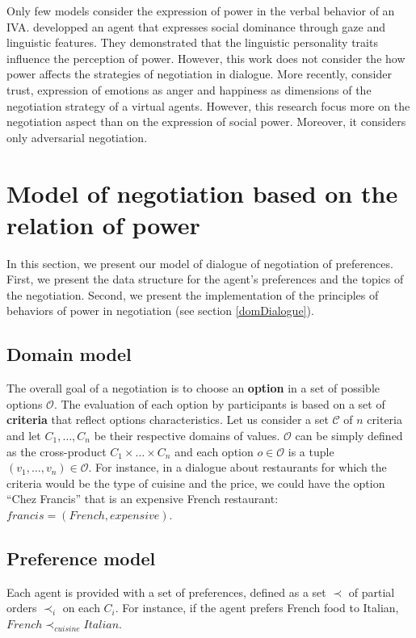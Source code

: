 \documentclass{llncs}
\begin{document}
	Only few models consider the expression of power in the verbal behavior of an IVA. \cite{bee2010bossy} developped an agent that expresses social dominance through gaze and linguistic features. They demonstrated that the linguistic personality traits influence the perception of power. However, this work does not consider the how power affects the strategies of negotiation in dialogue. More recently, \cite{traum2008multi,de2011effect,de2015humans}consider trust, expression of emotions as anger and happiness as dimensions of the negotiation strategy of a virtual agents. However, this research focus more on the negotiation aspect than on the expression of social power. Moreover, it considers only adversarial negotiation.
	
	
	\section{Model of negotiation based on the relation of power}
	In this section, we present our model of dialogue of negotiation of preferences.	
	First, we present the data structure for the agent's preferences and the topics of the negotiation. Second, we present the implementation of the principles of behaviors of power in negotiation (see section \ref{domDialogue}).

	\subsection{Domain model}
	The overall goal of a negotiation is to choose an \textbf{option} in a set of possible options $\mathcal{O}$. The evaluation of each option by participants is based on a set of \textbf{criteria} that reflect options characteristics. Let us consider a set $\mathcal{C}$ of $n$ criteria and let $C_1,\ldots,C_n$ be their respective domains of values. $\mathcal{O}$ can be simply defined as the cross-product $C_1\times\ldots\times C_n$ and each option $o\in\mathcal{O}$ is a tuple $(v_1,\ldots,v_n)\in\mathcal{O}$. For instance, in a dialogue about restaurants for which the criteria would be the type of cuisine and the price, we could have the option ``Chez Francis'' that is an expensive French restaurant: $francis=(French,expensive)$.
	
	\subsection{Preference model} 
	Each agent is provided with a set of preferences, defined as a set $\prec$ of partial orders $\prec_i$ on each $C_i$. For instance, if the agent prefers French food to Italian, $French\prec_{cuisine}Italian$.
	
\end{document}
